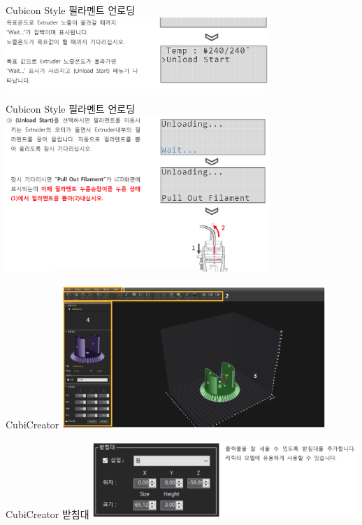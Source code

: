 \documentclass[11pt]{beamer}
\begin{document}
\begin{frame}[t]{Cubicon Style 필라멘트 언로딩}\footnotesize
	\centering
	\includegraphics[width=10cm]{./image/18_23.png}
\end{frame}

\begin{frame}[t]{Cubicon Style 필라멘트 언로딩}\footnotesize
	\centering
	\includegraphics[width=10cm]{./image/18_24.png}
\end{frame}


\begin{frame}[t]{CubiCreator}\footnotesize
	\centering
	\includegraphics[width=10cm]{./image/18_27.png}
\end{frame}

\begin{frame}[t]{CubiCreator 받침대}\footnotesize
	\centering
	\includegraphics[width=10cm]{./image/18_28.png}
\end{frame}
\end{document}
